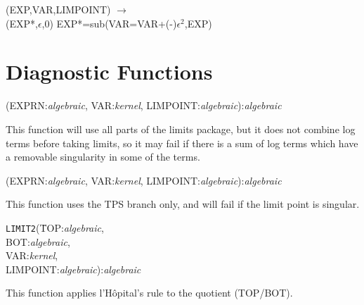 \vspace{.1in}
 (EXP,VAR,LIMPOINT) $\rightarrow$ \\
\hspace*{2em}{\tt LIMIT}(EXP*,$\epsilon$,0)
EXP*=sub(VAR=VAR+(-)$\epsilon^2$,EXP)

\section{Diagnostic Functions}

\vspace{.1in}
(EXPRN:{\em algebraic}, VAR:{\em kernel},
LIMPOINT:{\em algebraic}):{\em algebraic}
\vspace{.1in}

This function will use all parts of the limits package, but it does not
combine log terms before taking limits, so it may fail if there is a sum
of log terms which have a removable singularity in some of the terms.

\vspace{.1in}
(EXPRN:{\em algebraic}, VAR:{\em kernel},
LIMPOINT:{\em algebraic}):{\em algebraic}
\vspace{.1in}

This function uses the TPS branch only, and will fail if the limit point is
singular.

\vspace{.1in}
\begin{tabbing}
{\tt LIMIT2}(\=TOP:{\em algebraic}, \\
\>BOT:{\em algebraic}, \\
\>VAR:{\em kernel}, \\
\>LIMPOINT:{\em algebraic}):{\em algebraic}
\end{tabbing}
\vspace{.1in}

This function applies l'H\^{o}pital's rule to the quotient (TOP/BOT).

